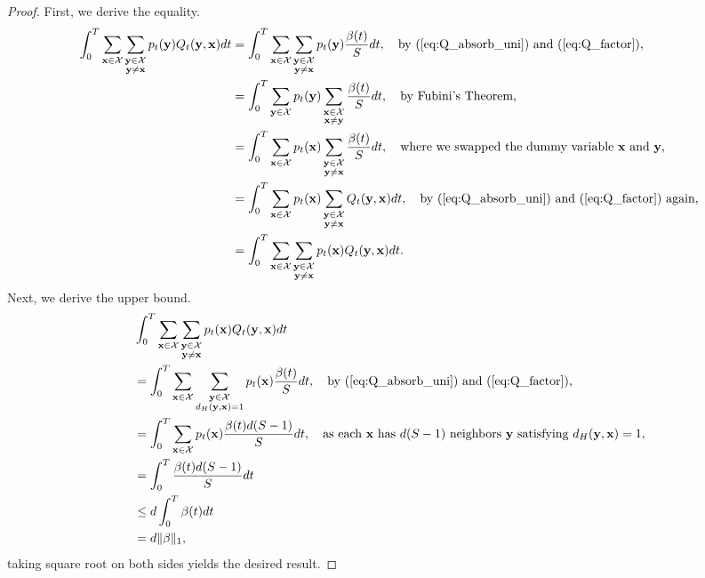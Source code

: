 \documentclass{article} %
\def\eqref#1{equation~\ref{#1}}
\newcommand{\bfx}{{\bf x}}
\newcommand{\bfy}{ {\bf y}}
\renewcommand{\eqref}[1]{\textup{(\ref{#1})}}
\newcommand{\distH}[2]{d_H(#1, #2)}
\begin{document}
\begin{proof}
First, we derive the equality.
\begin{align*}
    \int_0^T \sum\limits_{\substack{\bfx\in\mathcal{X}}} \sum\limits_{\substack{\bfy\in\mathcal{X} \\ \bfy\neq \bfx}} 
    p_t(\bfy)  Q_t(\bfy, \bfx) dt &= \int_0^T \sum\limits_{\substack{\bfx\in\mathcal{X}}} \sum\limits_{\substack{\bfy\in\mathcal{X} \\ \bfy\neq \bfx}} 
    p_t(\bfy)  \frac{\beta(t)}{S} dt, \quad \text{by~\eqref{eq:Q_absorb_uni} and~\eqref{eq:Q_factor},} \\
    &= \int_0^T \sum\limits_{\substack{\bfy \in\mathcal{X}}} p_t(\bfy)\sum\limits_{\substack{\bfx \in\mathcal{X} \\ \bfx \neq \bfy}} \frac{\beta(t)}{S} dt, \quad \text{by Fubini's Theorem,} \\
    &= \int_0^T \sum\limits_{\substack{\bfx \in\mathcal{X}}} p_t(\bfx)\sum\limits_{\substack{\bfy \in\mathcal{X} \\ \bfy \neq \bfx}} \frac{\beta(t)}{S} dt, \quad \text{where we swapped the dummy variable $\bfx$ and $\bfy$,} \\
    &= \int_0^T \sum\limits_{\substack{\bfx \in\mathcal{X}}} p_t(\bfx)\sum\limits_{\substack{\bfy \in\mathcal{X} \\ \bfy \neq \bfx}} Q_t(\bfy, \bfx) dt, \quad \text{by~\eqref{eq:Q_absorb_uni} and~\eqref{eq:Q_factor} again,} \\
    &= \int_0^T \sum\limits_{\substack{\bfx \in\mathcal{X}}} \sum\limits_{\substack{\bfy \in\mathcal{X} \\ \bfy \neq \bfx}} p_t(\bfx) Q_t(\bfy, \bfx) dt.
\end{align*}
Next, we derive the upper bound.
\begin{align*}
    &\int_0^T \sum\limits_{\substack{\bfx\in\mathcal{X}}} \sum\limits_{\substack{\bfy\in\mathcal{X} \\ \bfy\neq \bfx}} 
    p_t(\bfx)  Q_t(\bfy, \bfx) dt \\
    &=\int_0^T \sum\limits_{\substack{\bfx\in\mathcal{X}}} \sum\limits_{\substack{\bfy\in\mathcal{X} \\ \distH{\bfy}{\bfx} = 1}} p_t(\bfx)  \frac{\beta(t)}{S} dt, \quad \text{by~\eqref{eq:Q_absorb_uni} and~\eqref{eq:Q_factor},}\\
    &=\int_0^T \sum\limits_{\substack{\bfx\in\mathcal{X}}} p_t(\bfx)  \frac{\beta(t)d(S-1)}{S}dt, \quad \text{as each $\bfx$ has $d(S-1)$ neighbors $\bfy$ satisfying }\distH{\bfy}{\bfx} = 1,\\
    &=\int_0^T \frac{\beta(t)d(S-1)}{S} dt \\
    &\leq d \int_0^T \beta(t) dt\\
    &= d \|\beta\|_1,
\end{align*}
taking square root on both sides yields the desired result.
\end{proof}
\end{document}
